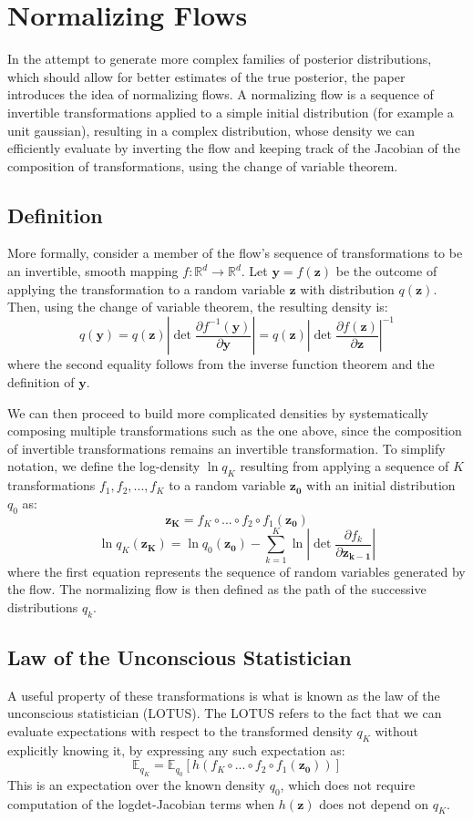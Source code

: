 \section*{Normalizing Flows}
In the attempt to generate more complex families of posterior distributions, which should allow for better estimates of the true posterior, the paper introduces the idea of normalizing flows. A normalizing flow is a sequence of invertible transformations applied to a simple initial distribution (for example a unit gaussian), resulting in a complex distribution, whose density we can efficiently evaluate by inverting the flow and keeping track of the Jacobian of the composition of transformations, using the change of variable theorem.

\subsection*{Definition}

More formally, consider a member of the flow's sequence of transformations to be an invertible, smooth mapping $f:\mathbb{R}^d \rightarrow \mathbb{R}^d$. Let $\mathbf{y}=f(\mathbf{z})$ be the outcome of applying the transformation to a random variable $\mathbf{z}$ with distribution $q(\mathbf{z})$. Then, using the change of variable theorem, the resulting density is:
\[ q(\mathbf{y}) = q(\mathbf{z}) \left| \det \frac{\partial f^{-1}(\mathbf{y})}{\partial \mathbf{y}}  \right| = q(\mathbf{z}) \left| \det \frac{\partial f(\mathbf{z})}{\partial \mathbf{z}} \right| ^ {-1} \]
where the second equality follows from the inverse function theorem and the definition of $\mathbf{y}$.

We can then proceed to build more complicated densities by systematically composing multiple transformations such as the one above, since the composition of invertible transformations remains an invertible transformation. To simplify notation, we define the log-density $\ln q_K$ resulting from applying a sequence of $K$ transformations $f_1,f_2,...,f_K$ to a random variable $\mathbf{z_0}$ with an initial distribution $q_0$ as:
\[ \mathbf{z_K} = f_K \circ ... \circ f_2 \circ f_1(\mathbf{z_0}) \]
\[ \ln q_K(\mathbf{z_K}) = \ln q_0(\mathbf{z_0}) - \sum_{k=1}^{K} \ln \left| \det \frac{\partial f_k}{\partial \mathbf{z_{k-1}}} \right|  \]
where the first equation represents the sequence of random variables generated by the flow.  The normalizing flow is then defined as the path of the successive distributions $q_k$. 

\subsection*{Law of the Unconscious Statistician}
A useful property of these transformations is what is known as the law of the unconscious statistician (LOTUS). The LOTUS refers to the fact that we can evaluate expectations with respect to the transformed density $q_K$ without explicitly knowing it, by expressing any such expectation as:
\[ \mathbb{E}_{q_K} = \mathbb{E}_{q_0}[h(f_K \circ ... \circ f_2 \circ f_1(\mathbf{z_0}))] \]
This is an expectation over the known density $q_0$, which does not require computation of the logdet-Jacobian terms when $h(\mathbf{z})$ does not depend on $q_K$.

